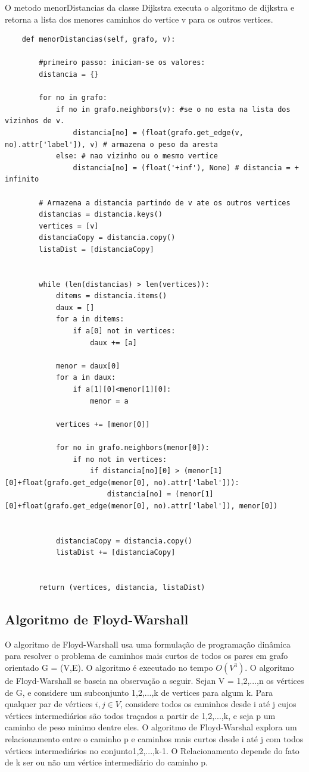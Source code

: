 \documentclass[a4paper,12pt]{article}
\begin{document}
O metodo menorDistancias da classe Dijkstra executa o algoritmo de dijkstra e retorna a lista dos menores caminhos do vertice v para os outros vertices.
\begin{lstlisting}
	def menorDistancias(self, grafo, v):

		#primeiro passo: iniciam-se os valores:
		distancia = {}
	
		for no in grafo:
			if no in grafo.neighbors(v): #se o no esta na lista dos vizinhos de v.
				distancia[no] = (float(grafo.get_edge(v, no).attr['label']), v) # armazena o peso da aresta
			else: # nao vizinho ou o mesmo vertice
				distancia[no] = (float('+inf'), None) # distancia = + infinito
	
		# Armazena a distancia partindo de v ate os outros vertices
		distancias = distancia.keys()
		vertices = [v]
		distanciaCopy = distancia.copy()
		listaDist = [distanciaCopy]

				
		while (len(distancias) > len(vertices)):
			ditems = distancia.items()
			daux = []
			for a in ditems:
				if a[0] not in vertices:
					daux += [a]

			menor = daux[0]
			for a in daux:
				if a[1][0]<menor[1][0]:
					menor = a

			vertices += [menor[0]]

			for no in grafo.neighbors(menor[0]):
				if no not in vertices:
					if distancia[no][0] > (menor[1][0]+float(grafo.get_edge(menor[0], no).attr['label'])):
						distancia[no] = (menor[1][0]+float(grafo.get_edge(menor[0], no).attr['label']), menor[0])

			
			distanciaCopy = distancia.copy()
			listaDist += [distanciaCopy]


		return (vertices, distancia, listaDist)
\end{lstlisting}
\newpage
\subsection{Algoritmo de Floyd-Warshall}
O algoritmo de Floyd-Warshall usa uma formulação de programação dinâmica para resolver o problema de caminhos mais curtos de todos os pares em grafo orientado G = (V,E). O algoritmo é executado no tempo \emph{$O(V^3)$}. 
O algoritmo de Floyd-Warshall se baseia na observação a seguir. Sejan V = {1,2,...,n} os vértices de G, e considere um subconjunto {1,2,...,k} de vertices  para algum k. Para qualquer par de vértices $i,j \in V$, considere todos os caminhos desde i até j cujos vértices intermediários são todos traçados a partir de {1,2,...,k}, e seja p um caminho de peso minimo dentre eles. O algoritmo de Floyd-Warshal explora um relacionamento entre o caminho p e caminhos mais curtos desde i até j com todos vértices intermediários no conjunto{1,2,...,k-1}. O Relacionamento depende do fato de k ser ou não um vértice intermediário do caminho p.
\end{document}
